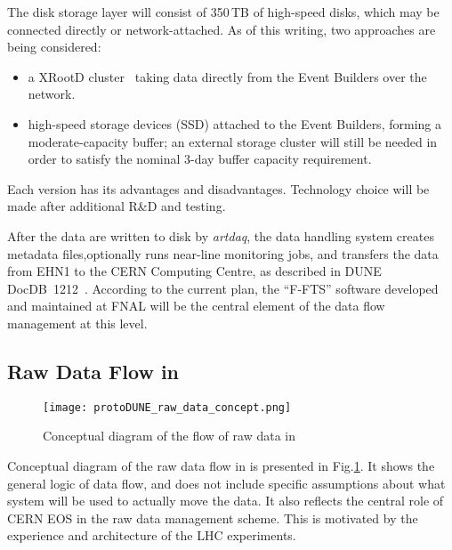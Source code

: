 The disk storage layer will consist of 350\,TB of high-speed
disks, which may be connected directly or network-attached.  As of this writing,
two approaches are being considered:
\begin{itemize}
\item a XRootD cluster~\cite{xrootd} taking data directly from the Event Builders over the network.
\item high-speed storage devices (SSD) attached to the Event Builders, forming a moderate-capacity buffer;
an external storage cluster will still be needed in order to satisfy the nominal 3-day buffer capacity requirement.
\end{itemize}


\noindent Each version has its advantages and disadvantages. Technology choice will be made after
additional R\&D and testing.


After the data are written to disk by {\it artdaq}, the data handling
system creates metadata files,optionally  runs near-line monitoring jobs, and
transfers the data from EHN1 to the CERN Computing Centre, as
described in DUNE DocDB~1212~\cite{docdb1212}. According to the current plan,
the ``F-FTS'' software developed and maintained at FNAL will be the central element
of the data flow management at this level.


\subsection{Raw Data Flow in \pd}
\label{sec:raw_concept}
\begin{figure}[tbh]
\centering\texttt{[image: protoDUNE\_raw\_data\_concept.png]}
\caption{\label{fig:raw_concept}Conceptual diagram of the flow of raw data in \pd}
\end{figure}

\noindent
Conceptual diagram of the raw data flow in \pd is presented in Fig.\ref{fig:raw_concept}. It shows the general logic
of data flow, and does not include specific assumptions about what system will be used to actually move the data.
It also reflects the central role of CERN EOS in the \pd raw data management scheme. This is motivated by the experience
and architecture of the LHC experiments.

